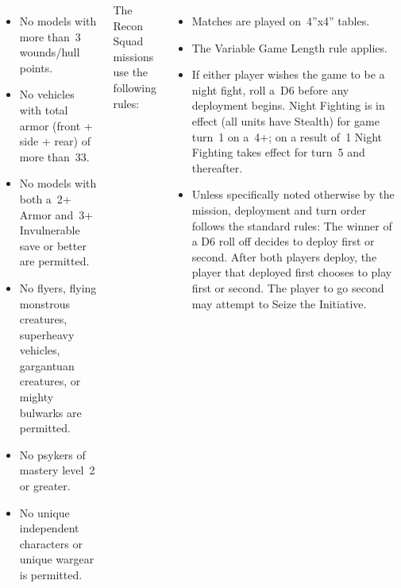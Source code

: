 \begin{columns}
\begin{itemize}
  \item No models with more than~3 wounds/hull points.

  \item No vehicles with total armor (front + side + rear) of more
    than~33.

  \item No models with both a~2+ Armor and~3+ Invulnerable save or
    better are permitted.

  \item No flyers, flying monstrous creatures, superheavy vehicles,
    gargantuan creatures, or mighty bulwarks are permitted.

  \item No psykers of mastery level~2 or greater.

  \item No unique independent characters or unique wargear is
    permitted.
  \end{itemize}

The Recon Squad missions use the following rules:

\begin{itemize}\shortlist
\item Matches are played on~4''x4'' tables.

\item The Variable Game Length rule applies.

\item If either player wishes the game to be a night fight, roll a~D6
  before any deployment begins. Night Fighting is in effect (all units
  have Stealth) for game turn~1 on a~4+; on a result of~1 Night
  Fighting takes effect for turn~5 and thereafter.

\item Unless specifically noted otherwise by the mission, deployment
  and turn order follows the standard rules: The winner of a D6 roll
  off decides to deploy first or second. After both players deploy,
  the player that deployed first chooses to play first or second. The
  player to go second may attempt to Seize the Initiative.

\end{itemize}

\end{columns}

